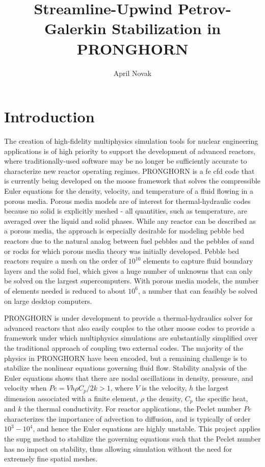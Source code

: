 \documentclass[10pt]{article}
\numberwithin{equation}{section} %
\begin{document}
\title{Streamline-Upwind Petrov-Galerkin Stabilization in PRONGHORN}
\author{April Novak}
\maketitle

\section{Introduction}

The creation of high-fidelity multiphysics simulation tools for nuclear engineering applications is of high priority to support the development of advanced reactors, where traditionally-used software may be no longer be sufficiently accurate to characterize new reactor operating regimes. PRONGHORN is a \gls{fe} \gls{cfd} code that is currently being developed on the \gls{moose} framework that solves the compressible Euler equations for the density, velocity, and temperature of a fluid flowing in a porous media. Porous media models are of interest for thermal-hydraulic codes because no solid is explicitly meshed - all quantities, such as temperature, are averaged over the liquid and solid phases. While any reactor can be described as a porous media, the approach is especially desirable for modeling pebble bed reactors due to the natural analog between fuel pebbles and the pebbles of sand or rocks for which porous media theory was initially developed. Pebble bed reactors require a mesh on the order of \(10^10\) elements to capture fluid boundary layers and the solid fuel, which gives a huge number of unknowns that can only be solved on the largest supercomputers. With porous media models, the number of elements needed is reduced to about \(10^6\), a number that can feasibly be solved on large desktop computers.

PRONGHORN is under development to provide a thermal-hydraulics solver for advanced reactors that also easily couples to the other
\gls{moose} codes to provide a framework under which multiphysics simulations are substantially simplified over the traditional approach of coupling two external codes. The majority of the physics in PRONGHORN have been encoded, but a remaining challenge is to stabilize the nonlinear equations governing fluid flow. Stability analysis of the Euler equations shows that there are nodal oscillations in density, pressure, and velocity when \(Pe=Vh\rho C_p/2k>1\), where \(V\) is the velocity, \(h\) the largest dimension associated with a finite element, \(\rho\) the density, \(C_p\) the specific heat, and \(k\) the thermal conductivity. For reactor applications, the Peclet number \(Pe\) characterizes the importance of advection to diffusion, and is typically of order \(10^3-10^4\), and hence the Euler equations are highly unstable. This project applies the \gls{supg} method to stabilize the governing equations such that the Peclet number has no impact on stability, thus allowing simulation without the need for extremely fine spatial meshes.
\end{document}
